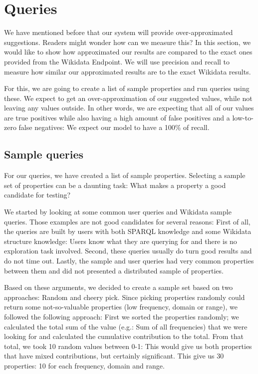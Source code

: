 

\section{Queries}

We have mentioned before that our system will provide over-approximated suggestions. Readers might wonder how can we measure this? In this section, we would like to show how approximated our results are compared to the exact ones provided from the Wikidata Endpoint. We will use precision and recall to measure how similar our approximated results are to the exact Wikidata results.

For this, we are going to create a list of sample properties and run queries using these. We expect to get an over-approximation of our suggested values, while not leaving any values outside. In other words, we are expecting that all of our values are true positives while also having a high amount of false positives and a low-to-zero false negatives: We expect our model to have a 100\% of recall.

\subsection{Sample queries}
For our queries, we have created a list of sample properties. Selecting a sample set of properties can be a daunting task: What makes a property a good candidate for testing? 

We started by looking at some common user queries and Wikidata sample queries. Those examples are not good candidates for several reasons: First of all, the queries are built by users with both SPARQL knowledge and some Wikidata structure knowledge: Users know what they are querying for and there is no exploration task involved. Second, these queries usually do turn good results and do not time out. Lastly, the sample and user queries had very common properties between them and did not presented a distributed sample of properties. 

Based on these arguments, we decided to create a sample set based on two approaches: Random and cheery pick. Since picking properties randomly could return some not-so-valuable properties (low frequency, domain or range), we followed the following approach: First we sorted the properties randomly; we calculated the total sum of the value (e.g.: Sum of all frequencies) that we were looking for and calculated the cumulative contribution to the total. From that total, we took 10 random values between 0-1: This would give us both properties that have mixed contributions, but certainly significant. This give us 30 properties: 10 for each frequency, domain and range.

